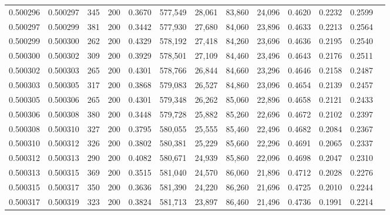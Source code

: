 \begin{tabular}{rrrrrrrrrrrrr}
0.500296 & 0.500297 &    345 & 200 &                                     0.3670 & 577,549 &  28,061 &  83,860 &  24,096 & 0.4620 & 0.2232 & 0.2599 \\
0.500297 & 0.500299 &    381 & 200 &                                     0.3442 & 577,930 &  27,680 &  84,060 &  23,896 & 0.4633 & 0.2213 & 0.2564 \\
0.500299 & 0.500300 &    262 & 200 &                                     0.4329 & 578,192 &  27,418 &  84,260 &  23,696 & 0.4636 & 0.2195 & 0.2540 \\
0.500300 & 0.500302 &    309 & 200 &                                     0.3929 & 578,501 &  27,109 &  84,460 &  23,496 & 0.4643 & 0.2176 & 0.2511 \\
0.500302 & 0.500303 &    265 & 200 &                                     0.4301 & 578,766 &  26,844 &  84,660 &  23,296 & 0.4646 & 0.2158 & 0.2487 \\
0.500303 & 0.500305 &    317 & 200 &                                     0.3868 & 579,083 &  26,527 &  84,860 &  23,096 & 0.4654 & 0.2139 & 0.2457 \\
0.500305 & 0.500306 &    265 & 200 &                                     0.4301 & 579,348 &  26,262 &  85,060 &  22,896 & 0.4658 & 0.2121 & 0.2433 \\
0.500306 & 0.500308 &    380 & 200 &                                     0.3448 & 579,728 &  25,882 &  85,260 &  22,696 & 0.4672 & 0.2102 & 0.2397 \\
0.500308 & 0.500310 &    327 & 200 &                                     0.3795 & 580,055 &  25,555 &  85,460 &  22,496 & 0.4682 & 0.2084 & 0.2367 \\
0.500310 & 0.500312 &    326 & 200 &                                     0.3802 & 580,381 &  25,229 &  85,660 &  22,296 & 0.4691 & 0.2065 & 0.2337 \\
0.500312 & 0.500313 &    290 & 200 &                                     0.4082 & 580,671 &  24,939 &  85,860 &  22,096 & 0.4698 & 0.2047 & 0.2310 \\
0.500313 & 0.500315 &    369 & 200 &                                     0.3515 & 581,040 &  24,570 &  86,060 &  21,896 & 0.4712 & 0.2028 & 0.2276 \\
0.500315 & 0.500317 &    350 & 200 &                                     0.3636 & 581,390 &  24,220 &  86,260 &  21,696 & 0.4725 & 0.2010 & 0.2244 \\
0.500317 & 0.500319 &    323 & 200 &                                     0.3824 & 581,713 &  23,897 &  86,460 &  21,496 & 0.4736 & 0.1991 & 0.2214 \\

\end{tabular}

